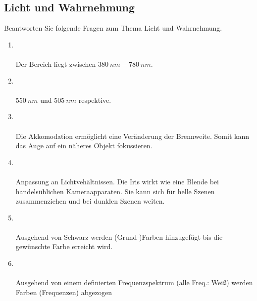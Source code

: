 \subsection{Licht und Wahrnehmung}
Beantworten Sie folgende Fragen zum Thema Licht und Wahrnehmung.
\begin{enumerate}
    \item   {}\\\\
            Der Bereich liegt zwischen $\SI{380}{nm}-\SI{780}{nm}$.

    \item   {}\\\\
            $\SI{550}{nm}$ und $\SI{505}{nm}$ respektive.

    \item   {}\\\\
            Die Akkomodation ermöglicht eine Veränderung der Brennweite. Somit kann das Auge auf ein
            näheres Objekt fokussieren.

    \item   {}\\\\
            Anpassung an Lichtvehältnissen. Die Iris wirkt wie eine Blende bei handelsüblichen Kameraapparaten. Sie kann sich für helle Szenen 
            zusammenziehen und bei dunklen Szenen weiten.
    \clearpage
    \item   {}\\\\
            Ausgehend von Schwarz werden (Grund-)Farben hinzugefügt bis die gewünschte Farbe erreicht wird.
    \item   {}\\\\
            Ausgehend von einem definierten Frequenzspektrum (alle Freq.: Weiß) werden Farben (Frequenzen) abgezogen 


\end{enumerate}
